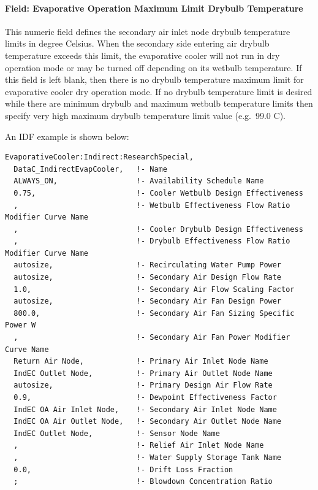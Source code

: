 \paragraph{Field: Evaporative Operation Maximum Limit Drybulb Temperature}\label{field-evaporative-operation-maximum-limit-drybulb-temperature-1}

This numeric field defines the secondary air inlet node drybulb temperature limits in degree Celsius. When the secondary side entering air drybulb temperature exceeds this limit, the evaporative cooler will not run in dry operation mode or may be turned off depending on its wetbulb temperature. If this field is left blank, then there is no drybulb temperature maximum limit for evaporative cooler dry operation mode. If no drybulb temperature limit is desired while there are minimum drybulb and maximum wetbulb temperature limits then specify very high maximum drybulb temperature limit value (e.g.~99.0 C).

An IDF example is shown below:

\begin{lstlisting}
EvaporativeCooler:Indirect:ResearchSpecial,
  DataC_IndirectEvapCooler,   !- Name
  ALWAYS_ON,                  !- Availability Schedule Name
  0.75,                       !- Cooler Wetbulb Design Effectiveness
  ,                           !- Wetbulb Effectiveness Flow Ratio Modifier Curve Name
  ,                           !- Cooler Drybulb Design Effectiveness
  ,                           !- Drybulb Effectiveness Flow Ratio Modifier Curve Name
  autosize,                   !- Recirculating Water Pump Power
  autosize,                   !- Secondary Air Design Flow Rate
  1.0,                        !- Secondary Air Flow Scaling Factor
  autosize,                   !- Secondary Air Fan Design Power
  800.0,                      !- Secondary Air Fan Sizing Specific Power W
  ,                           !- Secondary Air Fan Power Modifier Curve Name
  Return Air Node,            !- Primary Air Inlet Node Name
  IndEC Outlet Node,          !- Primary Air Outlet Node Name
  autosize,                   !- Primary Design Air Flow Rate
  0.9,                        !- Dewpoint Effectiveness Factor
  IndEC OA Air Inlet Node,    !- Secondary Air Inlet Node Name
  IndEC OA Air Outlet Node,   !- Secondary Air Outlet Node Name
  IndEC Outlet Node,          !- Sensor Node Name
  ,                           !- Relief Air Inlet Node Name
  ,                           !- Water Supply Storage Tank Name
  0.0,                        !- Drift Loss Fraction
  ;                           !- Blowdown Concentration Ratio
\end{lstlisting}

